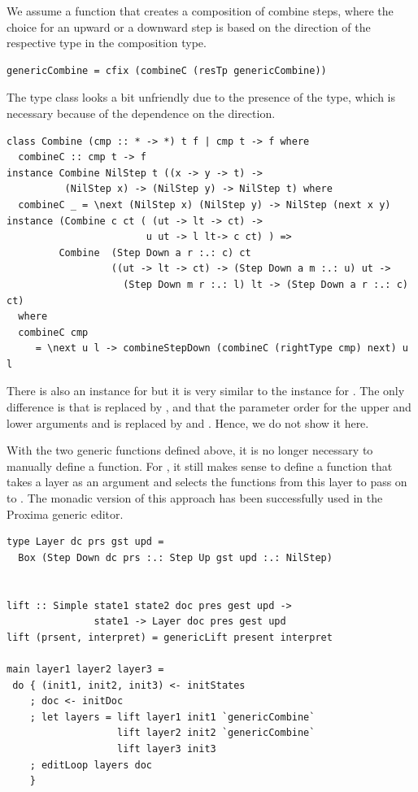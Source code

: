 \documentclass{llncs}
\begin{document}
We assume a function that creates a composition of  combine steps, where the choice for an upward or a downward step is based on the direction of the respective  type in the composition type.


\begin{small}
\begin{verbatim}
genericCombine = cfix (combineC (resTp genericCombine))
\end{verbatim}%
\end{small}

The type class looks a bit unfriendly due to the presence of the  type, which is necessary because of the dependence on the direction.

\begin{small}
\begin{verbatim}
class Combine (cmp :: * -> *) t f | cmp t -> f where
  combineC :: cmp t -> f
instance Combine NilStep t ((x -> y -> t) -> 
          (NilStep x) -> (NilStep y) -> NilStep t) where
  combineC _ = \next (NilStep x) (NilStep y) -> NilStep (next x y) 
instance (Combine c ct ( (ut -> lt -> ct) ->
                        u ut -> l lt-> c ct) ) =>
         Combine  (Step Down a r :.: c) ct 
                  ((ut -> lt -> ct) -> (Step Down a m :.: u) ut -> 
                    (Step Down m r :.: l) lt -> (Step Down a r :.: c) ct) 
  where
  combineC cmp 
     = \next u l -> combineStepDown (combineC (rightType cmp) next) u l
\end{verbatim}
\end{small}

There is also an instance for  but it is very similar to the instance for . The only difference is that  is replaced by , and that the parameter order for the upper and lower arguments   and  is replaced by  and . Hence, we do not show it here.



\bc
{}


With the two generic functions defined above, it is no longer necessary to manually define a  function. For , it still makes sense to define a function that takes a layer as an argument and selects the functions from this layer to pass on to . The monadic version of this approach has been successfully used in the Proxima generic editor.

\begin{small}
\begin{verbatim}
type Layer dc prs gst upd = 
  Box (Step Down dc prs :.: Step Up gst upd :.: NilStep)

                
lift :: Simple state1 state2 doc pres gest upd ->
               state1 -> Layer doc pres gest upd
lift (prsent, interpret) = genericLift present interpret

main layer1 layer2 layer3 =
 do { (init1, init2, init3) <- initStates
    ; doc <- initDoc 
    ; let layers = lift layer1 init1 `genericCombine` 
                   lift layer2 init2 `genericCombine`
                   lift layer3 init3
    ; editLoop layers doc
    }
\end{verbatim}
\end{small}
\end{document}
